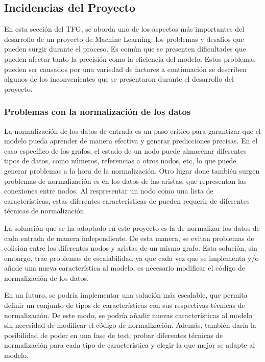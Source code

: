 \subsection{Incidencias del Proyecto}
En esta sección del TFG, se aborda uno de los aspectos más importantes del desarrollo 
de un proyecto de Machine Learning: los problemas y desafíos que pueden surgir durante 
el proceso. Es común que se presenten dificultades que pueden afectar tanto la precisión 
como la eficiencia del modelo. Estos problemas pueden ser causados por una variedad 
de factores a continuación se describen algunos de los inconvenientes que se presentaron
durante el desarrollo del proyecto.

\subsubsection{Problemas con la normalización de los datos}
La normalización de los datos de entrada es un paso crítico para garantizar que el 
modelo pueda aprender de manera efectiva y generar predicciones precisas. En el caso 
específico de los grafos, el estado de un nodo puede almacenar diferentes tipos de datos, 
como números, referencias a otros nodos, etc, lo que puede generar problemas a la hora 
de la normalización. Otro lugar done también surgen problemas de normalización es en los 
datos de las aristas, que representan las conexiones entre nodos. Al respresentar un 
nodo como una lista de características, estas diferentes caracteristicas de pueden 
requerir de diferentes técnicas de normalización.\medskip

La soluación que se ha adoptado en este proyecto es la de normalizar los datos de
cada entrada de manera independiente. De esta manera, se evitan problemas de colision 
entre los diferentes nodos y aristas de un mismo grafo. Esta solución, sin embargo,
trae problemas de escalabilidad ya que cada vez que se implementa y/o añade una nueva
característica al modelo, es necesario modificar el código de normalización de los datos.\medskip

En un futuro, se podría implementar una solución más escalable, que permita definir
un conjunto de tipos de características con sus respectivas técnicas de normalización.
De este modo, se podría añadir nuevas características al modelo sin necesidad de
modificar el código de normalización. Además, también daría la posibilidad de
poder en una fase de test, probar diferentes técnicas de normalización para
cada tipo de característica y elegir la que mejor se adapte al modelo.

